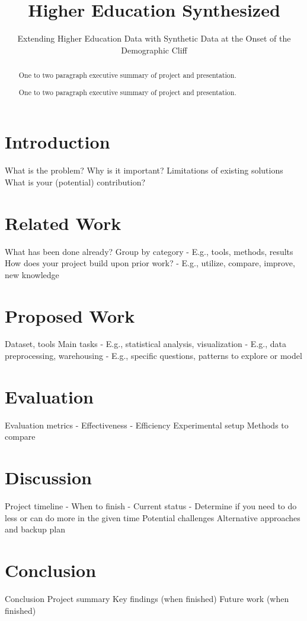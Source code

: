 \documentclass[sigconf, authorversion, nonacm]{acmart}
\begin{document}
\title{Higher Education Synthesized}
\subtitle{Extending Higher Education Data with Synthetic Data at the Onset of the Demographic Cliff}

\renewcommand{\shortauthors}{Leakakos}

\begin{abstract}
One to two paragraph executive summary of project and presentation.

One to two paragraph executive summary of project and presentation.
\end{abstract}

\maketitle

\section{Introduction}
What is the problem?
Why is it important?
Limitations of existing solutions
What is your (potential) contribution?

\section{Related Work}
What has been done already?
Group by category
    - E.g., tools, methods, results
How does your project build upon prior work?
    - E.g., utilize, compare, improve, new knowledge

\cite{DBLP:journals/corr/abs-1907-00503}

\cite{decristofaro2024syntheticdatamethodsuse}

\section{Proposed Work}
Dataset, tools
Main tasks
    - E.g., statistical analysis, visualization
    - E.g., data preprocessing, warehousing
    - E.g., specific questions, patterns to explore or model

\section{Evaluation}
Evaluation metrics
    - Effectiveness
    - Efficiency
Experimental setup
Methods to compare

\section{Discussion}
Project timeline
    - When to finish
    - Current status
    - Determine if you need to do less or can do more in the given time
Potential challenges
Alternative approaches and backup plan

\section{Conclusion}
Conclusion
Project summary
Key findings (when finished)
Future work (when finished)



\end{document}
